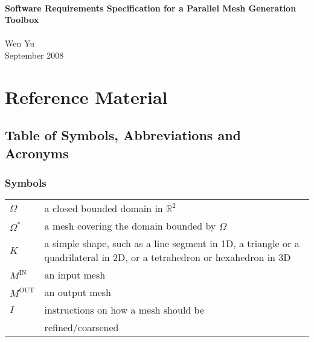 \documentclass[12pt,titlepage]{article}
\author{Wen Yu}
\begin{document}
\begin{titlepage}

\newcommand{\texttl}{\textsf} %
\newcommand{\textau}{\textsf} %

\begin{center}
 
\HRule \\[0.4cm]
{ \huge \bfseries \texttl{Software Requirements Specification for a Parallel Mesh Generation Toolbox}}\\[0.4cm]
 
\HRule \\[2cm]

\textau{\LARGE Wen Yu}\\[2cm]
 
\textau{\LARGE {September 2008}}
 
\vfill
 
\hfill
\textau{\LARGE
{}
}
\end{center}

\end{titlepage}

\tableofcontents

\newpage

\section{Reference Material}
\subsection{Table of Symbols, Abbreviations and Acronyms}

\subsubsection{Symbols}
\begin{tabular}{p{\firstCol}p{\secondCol}} 
$\Omega$ & a closed bounded domain in $\mathbb{R}^{2}$  \\
$\Omega^{*}$ & a mesh covering the domain bounded by $\Omega$\\
$K$ & a simple shape, such as a line segment in 1D, a triangle or a quadrilateral in 2D, or a tetrahedron or hexahedron
in 3D\\
$M^{\mbox{IN}}$ & an input mesh\\
$M^{\mbox{OUT}}$ & an output mesh\\
$I$ & instructions on how a mesh should be \\
 & refined/coarsened
\end{tabular}
\end{document}
